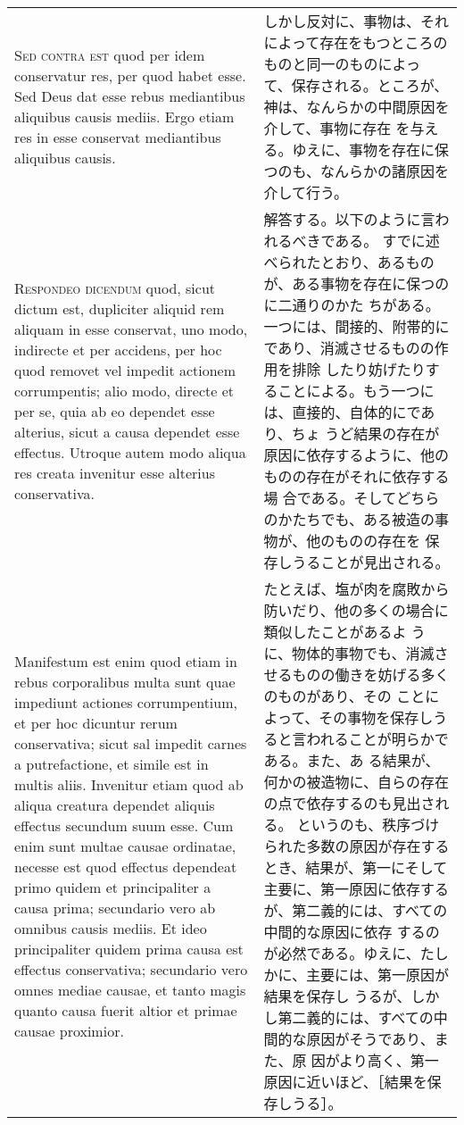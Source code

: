 \documentclass[10pt]{jsarticle} %
\begin{document}
\begin{longtable}{p{21em}p{21em}}
{\scshape  Sed contra est} quod per idem conservatur
res, per quod habet esse. Sed Deus dat esse rebus mediantibus aliquibus
causis mediis. Ergo etiam res in esse conservat mediantibus aliquibus
causis.

&

しかし反対に、事物は、それによって存在をもつところのものと同一のものによっ
 て、保存される。ところが、神は、なんらかの中間原因を介して、事物に存在
 を与える。ゆえに、事物を存在に保つのも、なんらかの諸原因を介して行う。

\\


{\scshape Respondeo dicendum} quod, sicut dictum est,
dupliciter aliquid rem aliquam in esse conservat, uno modo, indirecte et
per accidens, per hoc quod removet vel impedit actionem corrumpentis;
alio modo, directe et per se, quia ab eo dependet esse alterius, sicut a
causa dependet esse effectus. Utroque autem modo aliqua res creata
invenitur esse alterius conservativa. 



&

解答する。以下のように言われるべきである。
すでに述べられたとおり、あるものが、ある事物を存在に保つのに二通りのかた
 ちがある。一つには、間接的、附帯的にであり、消滅させるものの作用を排除
 したり妨げたりすることによる。もう一つには、直接的、自体的にであり、ちょ
 うど結果の存在が原因に依存するように、他のものの存在がそれに依存する場
 合である。そしてどちらのかたちでも、ある被造の事物が、他のものの存在を
 保存しうることが見出される。

\\


Manifestum est enim quod etiam in
rebus corporalibus multa sunt quae impediunt actiones corrumpentium, et
per hoc dicuntur rerum conservativa; sicut sal impedit carnes a
putrefactione, et simile est in multis aliis. Invenitur etiam quod ab
aliqua creatura dependet aliquis effectus secundum suum esse. 
Cum enim
sunt multae causae ordinatae, necesse est quod effectus dependeat primo
quidem et principaliter a causa prima; secundario vero ab omnibus causis
mediis. Et ideo principaliter quidem prima causa est effectus
conservativa; secundario vero omnes mediae causae, et tanto magis quanto
causa fuerit altior et primae causae proximior. 

&
たとえば、塩が肉を腐敗から防いだり、他の多くの場合に類似したことがあるよ
 うに、物体的事物でも、消滅させるものの働きを妨げる多くのものがあり、その
 ことによって、その事物を保存しうると言われることが明らかである。また、あ
 る結果が、何かの被造物に、自らの存在の点で依存するのも見出される。
というのも、秩序づけられた多数の原因が存在するとき、結果が、第一にそして
 主要に、第一原因に依存するが、第二義的には、すべての中間的な原因に依存
 するのが必然である。ゆえに、たしかに、主要には、第一原因が結果を保存し
 うるが、しかし第二義的には、すべての中間的な原因がそうであり、また、原
 因がより高く、第一原因に近いほど、［結果を保存しうる］。


\end{longtable}
\end{document}
